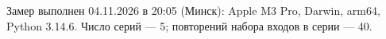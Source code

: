 Замер выполнен 04.11.2026 в 20:05 (Минск): Apple M3 Pro, Darwin, arm64, Python 3.14.6. Число серий --- 5; повторений набора входов в серии --- 40.
